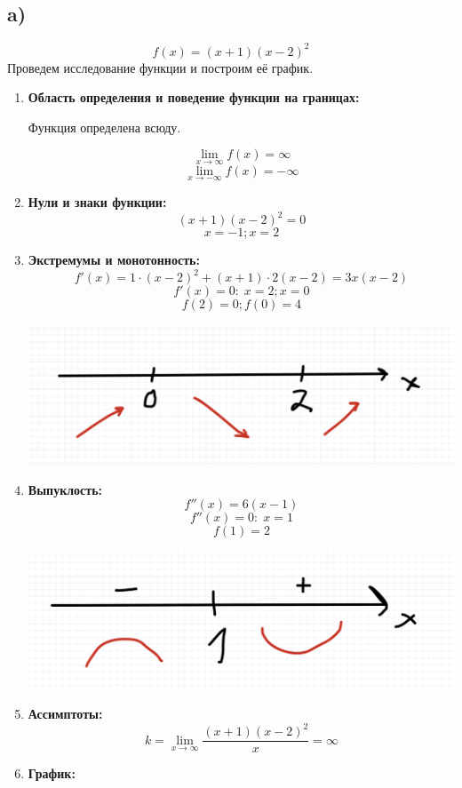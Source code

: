 \documentclass[a4paper,12pt]{article}
\begin{document}
\subsection*{a)}
\[
f(x) = (x+1)(x-2)^2
\]
Проведем исследование функции и построим её график.
\begin{enumerate}
\item \textbf{Область определения и поведение функции на границах:}

Функция определена всюду.

\[
\lim_{x \rightarrow \infty} f(x) = \infty
\]
\[
\lim_{x \rightarrow -\infty}  f(x) = -\infty
\]
\item \textbf{Нули и знаки функции:}
\[
(x+1)(x-2)^2 = 0
\]
\[
x = -1; x = 2
\]
\item \textbf{Экстремумы и монотонность:}
\[
f'(x) = 1 \cdot (x-2)^2 + (x+1) \cdot 2(x-2) = 3x(x-2)
\]
\[
f'(x) = 0 : \; x = 2; x = 0
\]
\[
f(2) = 0; f(0) = 4
\]
\begin{center}
\includegraphics[scale=0.2]{1.png}
\end{center}
\newpage
\item \textbf{Выпуклость:}
\[
f''(x) = 6(x-1)
\]
\[
f''(x) = 0 : \; x = 1
\]
\[
f(1) = 2
\]
\begin{center}
\includegraphics[scale=0.15]{2.png}
\end{center}
\item \textbf{Ассимптоты:}
\[
k = \lim_{x \rightarrow \infty} \frac{(x+1)(x-2)^2}{x} = \infty 
\]
\item \textbf{График:}
\begin{center}

\end{center}
\end{enumerate}
\end{document}
